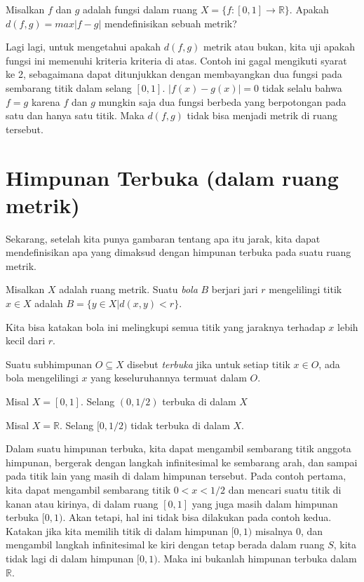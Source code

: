 \documentclass{book}
\begin{document}
\begin{contoh}
Misalkan $f$ dan $g$ adalah fungsi dalam ruang $X = \{ f:[0,1]\rightarrow\mathbb R \}$. Apakah $d(f,g)=max|f - g|$ mendefinisikan sebuah metrik?
\end{contoh}

Lagi lagi, untuk mengetahui apakah $d(f,g)$ metrik atau bukan, kita uji apakah fungsi ini memenuhi kriteria kriteria di atas. Contoh ini gagal mengikuti syarat ke 2, sebagaimana dapat ditunjukkan dengan membayangkan dua fungsi pada sembarang titik dalam selang $[0,1]$. $|f(x) - g(x)| = 0$ tidak selalu bahwa $f = g$ karena $f$ dan $g$ mungkin saja dua fungsi berbeda yang berpotongan pada satu dan hanya satu titik. Maka $d(f,g)$ tidak bisa menjadi metrik di ruang tersebut.

\section{Himpunan Terbuka (dalam ruang metrik)}
Sekarang, setelah kita punya gambaran tentang apa itu jarak, kita dapat mendefinisikan apa yang dimaksud dengan himpunan terbuka pada suatu ruang metrik.

\begin{definisi}
Misalkan $X$ adalah ruang metrik. Suatu \emph{bola} $B$ berjari jari $r$ mengelilingi titik $x\in X$ adalah $B = \{ y\in X|d(x,y) < r \}$.
\end{definisi}

\noindent Kita bisa katakan bola ini melingkupi semua titik yang jaraknya terhadap $x$ lebih kecil dari $r$.

\begin{definisi}
Suatu subhimpunan $O\subseteq X$ disebut \emph{terbuka} jika untuk setiap titik $x\in O$, ada bola mengelilingi $x$ yang keseluruhannya termuat dalam $O$.
\end{definisi}

\begin{contoh}
Misal $X = [0,1]$. Selang $(0,1/2)$ terbuka di dalam $X$
\end{contoh}
\begin{contoh}
Misal $X = \mathbb R$. Selang $[0,1/2)$ tidak terbuka di dalam $X$.
\end{contoh}

Dalam suatu himpunan terbuka, kita dapat mengambil sembarang titik anggota himpunan, bergerak dengan langkah infinitesimal ke sembarang arah, dan sampai pada titik lain yang masih di dalam himpunan tersebut. Pada contoh pertama, kita dapat mengambil sembarang titik $0<x<1/2$ dan mencari suatu titik di kanan atau kirinya, di dalam ruang $[0,1]$ yang juga masih dalam himpunan terbuka $[0,1)$. Akan tetapi, hal ini tidak bisa dilakukan pada contoh kedua. Katakan jika kita memilih titik di dalam himpunan $[0,1)$ misalnya $0$, dan mengambil langkah infinitesimal ke kiri dengan tetap berada dalam ruang $S$, kita tidak lagi di dalam himpunan $[0,1)$. Maka ini bukanlah himpunan terbuka dalam $\mathbb R$.
\end{document}
